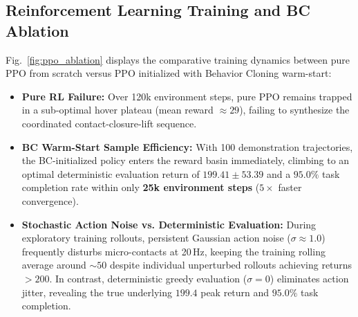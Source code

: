 \documentclass[conference]{IEEEtran}
\begin{document}
\begin{table}[!t]
\centering
\caption{PDDL Problem Generation and Deliberation Benchmark}
\label{tab:pddl_benchmark}
\end{table}

\subsection{Reinforcement Learning Training and BC Ablation}
Fig.~\ref{fig:ppo_ablation} displays the comparative training dynamics between pure PPO from scratch versus PPO initialized with Behavior Cloning warm-start:
\begin{itemize}
    \item \textbf{Pure RL Failure:} Over 120k environment steps, pure PPO remains trapped in a sub-optimal hover plateau (mean reward $\approx 29$), failing to synthesize the coordinated contact-closure-lift sequence.
    \item \textbf{BC Warm-Start Sample Efficiency:} With 100 demonstration trajectories, the BC-initialized policy enters the reward basin immediately, climbing to an optimal deterministic evaluation return of $199.41 \pm 53.39$ and a $\mathbf{95.0\%}$ task completion rate within only \textbf{25k environment steps} ($5\times$ faster convergence).
    \item \textbf{Stochastic Action Noise vs. Deterministic Evaluation:} During exploratory training rollouts, persistent Gaussian action noise ($\sigma \approx 1.0$) frequently disturbs micro-contacts at 20\,Hz, keeping the training rolling average around $\sim 50$ despite individual unperturbed rollouts achieving returns $>200$. In contrast, deterministic greedy evaluation ($\sigma = 0$) eliminates action jitter, revealing the true underlying $199.4$ peak return and $95.0\%$ task completion.
\end{itemize}
\end{document}

